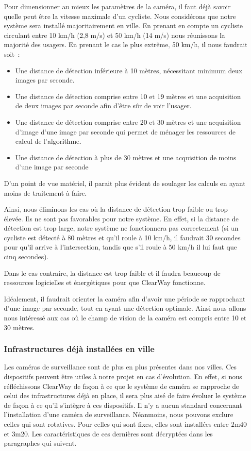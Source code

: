 Pour dimensionner au mieux les paramètres de la caméra, il faut déjà savoir quelle peut être la vitesse maximale d’un cycliste.
Nous considérons que notre système sera installé majoritairement en ville.
En prenant en compte un cycliste circulant entre 10 km/h (2,8 m/s) et 50 km/h (14 m/s) nous réunissons la majorité des usagers.
En prenant le cas le plus extrême, 50 km/h, il nous faudrait soit :
\begin{itemize}
    \item Une distance de détection inférieure à 10 mètres, nécessitant minimum deux images par seconde.
    \item Une distance de détection comprise entre 10 et 19 mètres et une acquisition de deux images par seconde afin
          d’être sûr de voir l’usager.
    \item Une distance de détection comprise entre 20 et 30 mètres et une acquisition d’image d'une image par seconde qui permet
          de ménager les ressources de calcul de l’algorithme.
    \item Une distance de détection à plus de 30 mètres et une acquisition de moins d'une image par seconde
\end{itemize}
D'un point de vue matériel, il parait plus évident de soulager les calculs en ayant moins de traitement à faire.

Ainsi, nous éliminons les cas où la distance de détection trop faible ou trop élevée. Ils ne sont pas favorables pour notre système.
En effet, si la distance de détection est trop large, notre système ne fonctionnera pas correctement (si un cycliste est détecté à 80 mètres et qu'il roule à 10 km/h,
il faudrait 30 secondes pour qu'il arrive à l'intersection, tandis que s'il roule à 50 km/h il lui faut que cinq secondes).

Dans le cas contraire, la distance est trop faible et il faudra beaucoup de ressources logicielles et énergétiques pour que ClearWay fonctionne.

Idéalement, il faudrait orienter la caméra afin d'avoir une période se rapprochant d'une image par seconde, tout en ayant une détection optimale.
Ainsi nous allons nous intéressé aux cas où le champ de vision de la caméra est compris entre 10 et 30 mètres.

\subsubsection{Infrastructures déjà installées en ville}
\label{sec:camera_infra}
Les caméras de surveillance sont de plus en plus présentes dans nos villes. Ces dispositifs peuvent être utiles à notre projet en cas d'évolution.
En effet, si nous réfléchissons ClearWay de façon à ce que le système de caméra se rapproche de celui des infrastructures déjà en place,
il sera plus aisé de faire évoluer le système de façon à ce qu'il s'intègre à ces dispositifs.
Il n'y a aucun standard concernant l'installation d'une caméra de surveillance. Néanmoins, nous pouvons exclure celles qui sont rotatives.
Pour celles qui sont fixes, elles sont installées entre 2m40 et 3m20. Les caractéristiques de ces dernières sont décryptées dans les paragraphes qui suivent.

